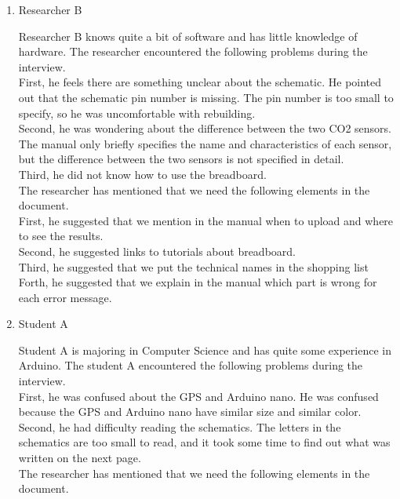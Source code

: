 \documentclass[conference]{IEEEtran}
\begin{document}
\begin{enumerate}
\begin{enumerate}
\item Researcher B

Researcher B knows quite a bit of software and has little knowledge of hardware. The researcher encountered the following problems during the interview.\\

		First, he feels there are something unclear about the schematic. He pointed out that the schematic pin number is missing. The pin number is too small to specify, so he was uncomfortable with rebuilding.\\
		Second, he was wondering about the difference between the two CO2 sensors. The manual only briefly specifies the name and characteristics of each sensor, but the difference between the two sensors is not specified in detail.\\
		Third, he did not know how to use the breadboard.\\

The researcher has mentioned that we need the following elements in the document.\\

		First, he suggested that we mention in the manual when to upload and where to see the results. \\
		Second, he suggested links to tutorials about breadboard.\\
		Third, he suggested that we put the technical names in the shopping list\\
		Forth, he suggested that we explain in the manual which part is wrong for each error message.\\

\item Student A

Student A is majoring in Computer Science and has  quite some experience in Arduino. The student A encountered the following problems during the interview.\\

		First, he was confused about the GPS and Arduino nano. He was confused because the GPS and Arduino nano have similar size and similar color.\\
		Second, he had difficulty reading the schematics. The letters in the schematics are too small to read, and it took some time to find out what was written on the next page.\\

The researcher has mentioned that we need the following elements in the document.\\


\end{enumerate}
\end{enumerate}
\end{document}
